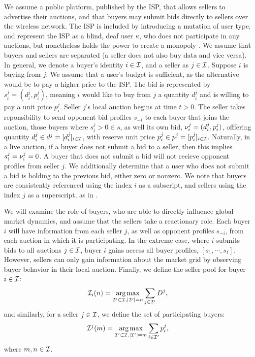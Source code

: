 We assume a public platform, published by the ISP, that allows sellers to advertise their
auctions, and that buyers may submit bids directly to sellers over the wireless
network. 
The ISP is included
by introducing a mutation of user type, and represent
the ISP as a blind, deaf user $\kappa$, who does not participate
in any auctions, but nonetheless holds the power to create a monopoly
.
We assume that buyers and sellers are
separated (a seller does not also buy data and vice versa). 
In general, we denote a buyer's identity $i \in \mathcal{I}$, and a seller as
$j\in\mathcal{I}$.
Suppose $i$ is buying from $j$. We assume that a user's budget is 
sufficient, as the alternative would be to pay a higher price to the ISP. The bid is represented by $s_i^j = (d_i^j, p_i^j)$, 
meaning $i$ would like to buy from $j$ a quantity $d^j_i$ and is willing to pay
a unit price $p^j_i$. 
Seller $j$'s local auction begins at time $t>0$. The seller takes reponsibility
to send opponent bid profiles $s_{-i}$ to each buyer that joins the auction,
those buyers where $s_i^j > 0 \in s$, as well its own bid, $\nu_i^j = (d_i^j,
p_i^j)$, offfering quantity $d_i^j \in d^j = [d_i^j]_{i\in\mathcal{I}}$, 
with reserve unit price $p_i^j \in p^j = [p_i^j]_{i\in\mathcal{I}}$. 
Naturally, in a live auction, if a buyer does
not submit a bid to a seller, then this implies $s_i^j=\nu_i^j = 0$. A buyer that does not submit a bid will not recieve opponent profiles from seller
$j$. We additionally determine that a user who does not submit a bid is holding
to the previous bid, either zero or nonzero. We note that buyers are
consistently referenced using the index $i$ as a subscript, and sellers using
the index $j$ as a superscript, as in \cite{semret}.

We will examine the role of buyers, who are able to directly
influence global market dynamics, and assume that the sellers take a reactionary role.
Each buyer $i$ will have information from each seller $j$, as well as opponent
profiles $s_{-i}$, from each auction in which it is participating.
In the extreme case, where $i$ submits bids to all auctions $j\in\mathcal{I}$, buyer
$i$ gains access all buyer profiles, $[s_1, \cdots, s_I]$. However, 
sellers can only gain information about the market grid by observing buyer
behavior in their local auction.
Finally, we define the seller pool for buyer $i\in\mathcal{I}$: 
$$
    \mathcal{I}_i(n) =\operatorname*{arg\,max}_{\mathcal{I}' \subset \mathcal{I}, \vert\mathcal{I}'\vert =
n}\sum_{j\in\mathcal{I}'} D^j,
$$
and similarly, for a seller $j\in\mathcal{I}$, we define the set of participating buyers:
$$
    \mathcal{I}^j(m) =\operatorname*{arg\,max}_{{\mathcal{I}}' \subset \mathcal{I}, \vert{\mathcal{I}}'\vert =
m}\sum_{i\in{\mathcal{I}}'} p_i^j,
$$
where $m, n\in\mathcal{I}$.

